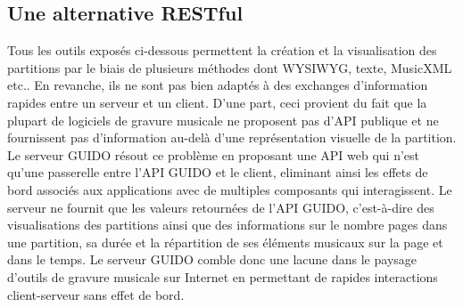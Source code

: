 \documentclass{article}
\begin{document}
\subsection{Une alternative RESTful}\label{subsection:restful}
Tous les outils exposés ci-dessous permettent la création et la visualisation des partitions par le biais de plusieurs méthodes dont WYSIWYG, texte, MusicXML etc.. En revanche, ils ne sont pas bien adaptés à des exchanges d'information rapides entre un serveur et un client. D'une part, ceci provient du fait que la plupart de logiciels de gravure musicale ne proposent pas d'API publique et ne fournissent pas d'information au-delà d'une représentation visuelle de la partition. Le serveur GUIDO résout ce problème en proposant une API web qui n'est qu'une passerelle entre l'API GUIDO  \cite{daudin09a} et le client, eliminant ainsi les effets de bord associés aux applications avec de multiples composants qui interagissent. Le serveur ne fournit que les valeurs retournées de l'API GUIDO, c'est-à-dire des visualisations des partitions ainsi que des informations sur le nombre pages dans une partition, sa durée et la répartition de ses éléments musicaux sur la page et dans le temps. Le serveur GUIDO comble donc une lacune dans le paysage d'outils de gravure musicale sur Internet en permettant de rapides interactions client-serveur sans effet de bord.

\end{document}
